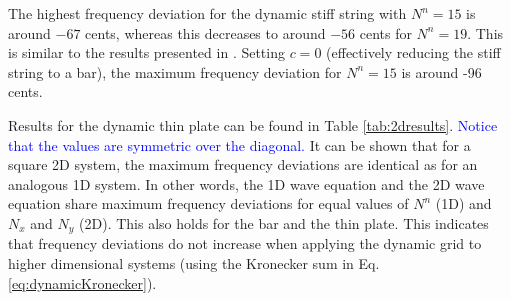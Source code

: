 \documentclass[fleqn]{jaes}
\def\SWcomment[#1]{\textcolor{blue}{#1}}
\begin{document}


The highest frequency deviation for the dynamic stiff string with $N^n = 15$ is around $-67$ cents, whereas this decreases to around $-56$ cents for $N^n = 19$. This is similar to the results presented in \cite{Willemsen2021a}. Setting $c=0$ (effectively reducing the stiff string to a bar), the maximum frequency deviation for $N^n=15$ is around -96 cents. 

Results for the dynamic thin plate can be found in Table \ref{tab:2dresults}. \SWcomment[Notice that the values are symmetric over the diagonal.] It can be shown that for a square 2D system, the maximum frequency deviations are identical as for an analogous 1D system. In other words, the 1D wave equation and the 2D wave equation share maximum frequency deviations for equal values of $N^n$ (1D) and $N_x$ and $N_y$ (2D). This also holds for the bar and the thin plate. This indicates that frequency deviations do not increase when applying the dynamic grid to higher dimensional systems (using the Kronecker sum in Eq. \eqref{eq:dynamicKronecker}).


\end{document}
